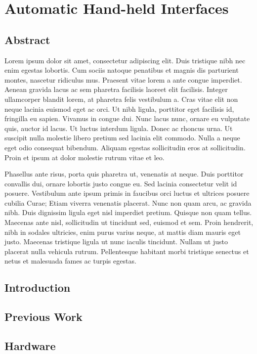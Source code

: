 \documentclass[12pt]{report}	%
\begin{document}
\chapter{Automatic Hand-held Interfaces}
\section{Abstract}
Lorem ipsum dolor sit amet, consectetur adipiscing elit. Duis tristique
nibh nec enim egestas lobortis. Cum sociis natoque penatibus et magnis
dis parturient montes, nascetur ridiculus mus. Praesent vitae lorem a
ante congue imperdiet. Aenean gravida lacus ac sem pharetra facilisis
laoreet elit facilisis. Integer ullamcorper blandit lorem, at pharetra
felis vestibulum a. Cras vitae elit non neque lacinia euismod eget ac
orci. Ut nibh ligula, porttitor eget facilisis id, fringilla eu
sapien. Vivamus in congue dui. Nunc lacus nunc, ornare eu vulputate
quis, auctor id lacus. Ut luctus interdum ligula. Donec ac rhoncus
urna. Ut suscipit nulla molestie libero pretium sed lacinia elit
commodo. Nulla a neque eget odio consequat bibendum. Aliquam egestas
sollicitudin eros at sollicitudin. Proin et ipsum at dolor molestie
rutrum vitae et leo.

Phasellus ante risus, porta quis pharetra ut, venenatis at neque. Duis
porttitor convallis dui, ornare lobortis justo congue eu. Sed lacinia
consectetur velit id posuere. Vestibulum ante ipsum primis in faucibus
orci luctus et ultrices posuere cubilia Curae; Etiam viverra venenatis
placerat. Nunc non quam arcu, ac gravida nibh. Duis dignissim ligula
eget nisl imperdiet pretium. Quisque non quam tellus. Maecenas ante
nisl, sollicitudin ut tincidunt sed, euismod et sem. Proin hendrerit,
nibh in sodales ultricies, enim purus varius neque, at mattis diam
mauris eget justo. Maecenas tristique ligula ut nunc iaculis
tincidunt. Nullam ut justo placerat nulla vehicula rutrum. Pellentesque
habitant morbi tristique senectus et netus et malesuada fames ac turpis
egestas.

\section{Introduction}

\section{Previous Work}

\section{Hardware}
\end{document}
